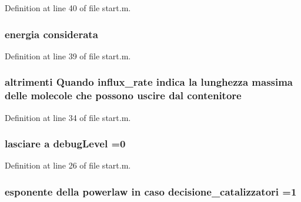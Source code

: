 Definition at line 40 of file start.\+m.

\hypertarget{a00113_ad76697f83c5d8bf201c45822af227e21}{
\subsubsection[{considerata}]{\setlength{\rightskip}{0pt plus 5cm}energia considerata}}\label{a00113_ad76697f83c5d8bf201c45822af227e21}


Definition at line 39 of file start.\+m.

\hypertarget{a00113_a8fcf98921930aa3720acdd081c5b0c2f}{
\subsubsection[{contenitore}]{\setlength{\rightskip}{0pt plus 5cm}altrimenti Quando {\bf influx\+\_\+rate} indica la {\bf lunghezza} massima delle molecole che possono uscire dal contenitore}}\label{a00113_a8fcf98921930aa3720acdd081c5b0c2f}


Definition at line 34 of file start.\+m.

\hypertarget{a00113_a08ef28bc85447e904ca9ea64de89b676}{
\subsubsection[{debug\+Level}]{\setlength{\rightskip}{0pt plus 5cm}lasciare {\bf a} debug\+Level =0}}\label{a00113_a08ef28bc85447e904ca9ea64de89b676}


Definition at line 26 of file start.\+m.

\hypertarget{a00113_a78948f867453293fcff0835b1bb05b8c}{
\subsubsection[{decisione\+\_\+catalizzatori}]{\setlength{\rightskip}{0pt plus 5cm}esponente della powerlaw in caso decisione\+\_\+catalizzatori =1}}\label{a00113_a78948f867453293fcff0835b1bb05b8c}


